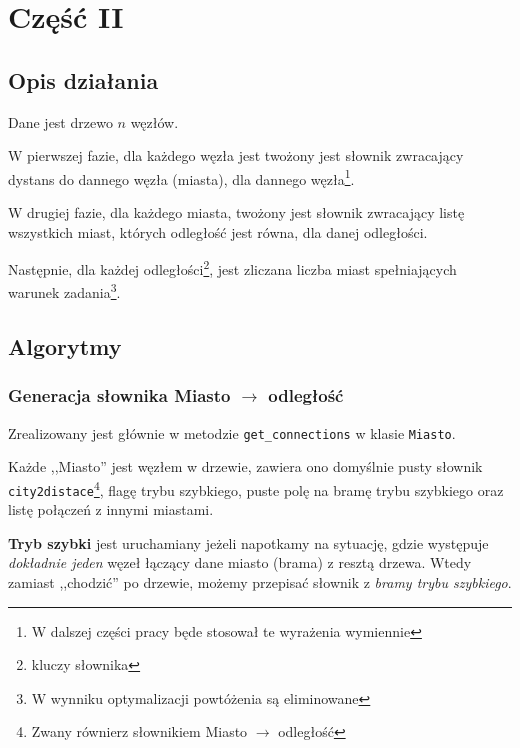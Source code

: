 \documentclass[12pt,a4paper]{article}
\begin{document}
	\newpage
	\section*{Część II}
	\subsection*{Opis działania} 
	
    Dane jest drzewo $n$ węzłów.

    W pierwszej fazie, dla każdego węzła jest twożony jest słownik zwracający
    dystans do dannego węzła (miasta), dla dannego węzła\footnote{W dalszej
    części pracy będe stosował te wyrażenia wymiennie}.

    W drugiej fazie, dla każdego miasta, twożony jest słownik zwracający listę
    wszystkich miast, których odległość jest równa, dla danej odległości.

    Następnie, dla każdej odległości\footnote{kluczy słownika}, jest zliczana
    liczba miast spełniających warunek zadania\footnote{W wynniku optymalizacji
    powtóżenia są eliminowane}.
	
	\subsection*{Algorytmy}
    
    \subsubsection*{Generacja słownika Miasto $\rightarrow$ odległość}

	Zrealizowany jest głównie w metodzie \texttt{get\_connections} w klasie \texttt{Miasto}.

	Każde ,,Miasto'' jest węzłem w drzewie, zawiera ono domyślnie pusty słownik \texttt{city2distace}\footnote{Zwany równierz słownikiem Miasto $\rightarrow$ odległość}, flagę trybu szybkiego, puste polę na bramę trybu szybkiego oraz listę połączeń z innymi miastami.

	\textbf{Tryb szybki} jest uruchamiany jeżeli napotkamy na sytuację, gdzie występuje \emph{dokładnie jeden} węzeł łączący dane miasto (brama) z resztą drzewa. Wtedy zamiast ,,chodzić'' po drzewie, możemy przepisać słownik z \emph{bramy trybu szybkiego}.
    
\end{document}
